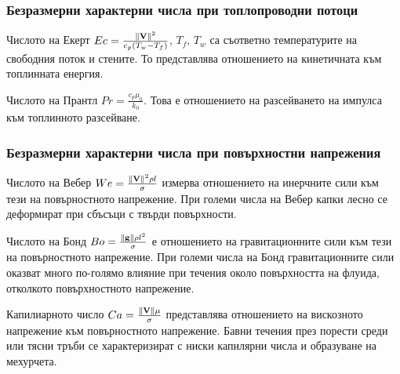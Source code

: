 \subsubsection{Безразмерни характерни числа при топлопроводни потоци}
Числото на Екерт $Ec = \frac{\norm{\mathbf{V}}^2}{c_p(T_w - T_f)}$, $T_f,\, T_w$ са съответно температурите на свободния поток и стените.
То представлява отношението на кинетичната към топлинната енергия.

Числото на Прантл $Pr = \frac{c_p \mu_0}{k_0}$.
Това е отношението на разсейването на импулса към топлинното разсейване.

\subsubsection{Безразмерни характерни числа при повърхностни напрежения}
Числото на Вебер $We = \frac{\norm{\mathbf{V}}^2 \rho l}{\sigma}$ измерва отношението на инерчните сили към тези на повърностното напрежение.
При големи числа на Вебер капки лесно се деформират при сбъсъци с твърди повърхности.

Числото на Бонд $Bo = \frac{\norm{\mathbf{g}} \rho l^2 }{\sigma}$ е отношението на гравитационните сили към тези на повърностното напрежение.
При големи числа на Бонд гравитационните сили оказват много по-голямо влияние при течения около повърхността на флуида, отколкото повърхностното напрежение.

Капилиарното число $Ca = \frac{\norm{\mathbf{V}} \mu}{\sigma}$ представлява отношението на вискозното напрежение към повърностното напрежение.
Бавни течения през порести среди или тясни тръби се характеризират с ниски капилярни числа и образуване на мехурчета.
